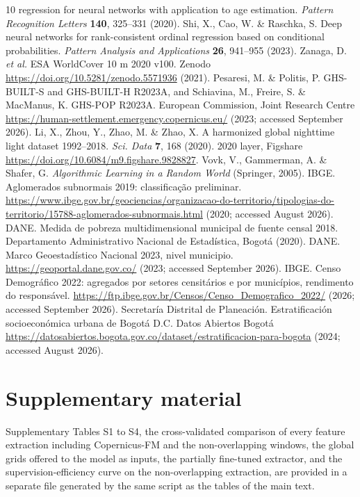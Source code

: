 \documentclass[11pt]{article}
\begin{document}
\begin{thebibliography}{10}
regression for neural networks with application to age estimation. \emph{Pattern
Recognition Letters} \textbf{140}, 325--331 (2020).
 Shi, X., Cao, W. \& Raschka, S. Deep neural networks for rank-consistent
ordinal regression based on conditional probabilities. \emph{Pattern Analysis and
Applications} \textbf{26}, 941--955 (2023).
 Zanaga, D. \emph{et al.} ESA WorldCover 10 m 2020 v100. Zenodo
\url{https://doi.org/10.5281/zenodo.5571936} (2021).
 Pesaresi, M. \& Politis, P. GHS-BUILT-S and GHS-BUILT-H R2023A, and
Schiavina, M., Freire, S. \& MacManus, K. GHS-POP R2023A. European Commission, Joint
Research Centre \url{https://human-settlement.emergency.copernicus.eu/} (2023; accessed
September 2026).
 Li, X., Zhou, Y., Zhao, M. \& Zhao, X. A harmonized global nighttime
light dataset 1992--2018. \emph{Sci. Data} \textbf{7}, 168 (2020). 2020 layer, Figshare
\url{https://doi.org/10.6084/m9.figshare.9828827}.
 Vovk, V., Gammerman, A. \& Shafer, G. \emph{Algorithmic Learning in a
Random World} (Springer, 2005).
 IBGE. Aglomerados subnormais 2019: classifica\c{c}\~ao preliminar.
\url{https://www.ibge.gov.br/geociencias/organizacao-do-territorio/tipologias-do-territorio/15788-aglomerados-subnormais.html}
(2020; accessed August 2026).
 DANE. Medida de pobreza multidimensional municipal de fuente censal
2018. Departamento Administrativo Nacional de Estad\'istica, Bogot\'a (2020).
 DANE. Marco Geoestad\'istico Nacional 2023, nivel municipio.
\url{https://geoportal.dane.gov.co/} (2023; accessed September 2026).
 IBGE. Censo Demogr\'afico 2022: agregados por setores censit\'arios e
por munic\'ipios, rendimento do respons\'avel.
\url{https://ftp.ibge.gov.br/Censos/Censo_Demografico_2022/} (2026; accessed September
2026).
 Secretar\'ia Distrital de Planeaci\'on. Estratificaci\'on
socioecon\'omica urbana de Bogot\'a D.C. Datos Abiertos Bogot\'a
\url{https://datosabiertos.bogota.gov.co/dataset/estratificacion-para-bogota} (2024;
accessed August 2026).
\end{thebibliography}

\section*{Supplementary material}
Supplementary Tables S1 to S4, the cross-validated comparison of every feature extraction
including Copernicus-FM and the non-overlapping windows, the global grids offered to the
model as inputs, the partially fine-tuned extractor, and the supervision-efficiency curve
on the non-overlapping extraction, are provided in a separate file
generated by the same script as the tables of the main text.
\end{document}
